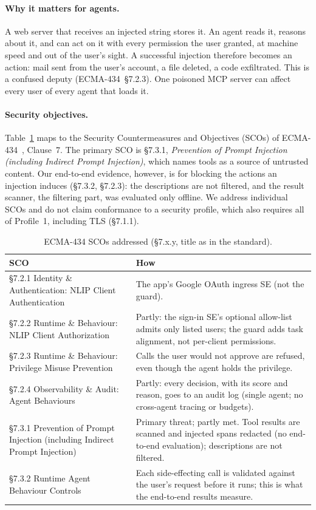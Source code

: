 \paragraph{Why it matters for agents.} A web server that receives an injected string stores
it. An agent reads it, reasons about it, and can act on it with every permission the user
granted, at machine speed and out of the user's sight. A successful injection therefore
becomes an action: mail sent from the user's account, a file deleted, a code exfiltrated.
This is a confused deputy (ECMA-434~\S7.2.3). One poisoned MCP server can affect every user
of every agent that loads it.

\paragraph{Security objectives.} Table~\ref{tab:sco} maps \sys to the Security
Countermeasures and Objectives (SCOs) of ECMA-434~\cite{ecma434}, Clause~7. The primary SCO
is \S7.3.1, \emph{Prevention of Prompt Injection (including Indirect Prompt Injection)},
which names tools as a source of untrusted content. Our end-to-end evidence, however, is for
blocking the actions an injection induces (\S7.3.2, \S7.2.3): the descriptions are not
filtered, and the result scanner, the filtering part, was evaluated only offline. We address individual SCOs and do not
claim conformance to a security profile, which also requires all of Profile~1, including TLS
(\S7.1.1).

\begin{table}[t]
\caption{ECMA-434 SCOs addressed (\S7.x.y, title as in the standard).}\label{tab:sco}
\small
\begin{tabular}{@{}>{\raggedright\arraybackslash}p{}>{\raggedright\arraybackslash}p{}@{}}
\toprule
SCO & How \\
\midrule
\S7.2.1 Identity \& Authentication: NLIP Client Authentication
  & The app's Google OAuth ingress SE (not the guard). \\
\S7.2.2 Runtime \& Behaviour: NLIP Client Authorization
  & Partly: the sign-in SE's optional allow-list admits only listed users; the guard adds task
    alignment, not per-client permissions. \\
\S7.2.3 Runtime \& Behaviour: Privilege Misuse Prevention
  & Calls the user would not approve are refused, even though the agent holds the privilege. \\
\S7.2.4 Observability \& Audit: Agent Behaviours
  & Partly: every decision, with its score and reason, goes to an audit log (single agent; no
    cross-agent tracing or budgets). \\
\S7.3.1 Prevention of Prompt Injection (including Indirect Prompt Injection)
  & Primary threat; partly met. Tool results are scanned and injected spans redacted (no
    end-to-end evaluation); descriptions are not filtered. \\
\S7.3.2 Runtime Agent Behaviour Controls
  & Each side-effecting call is validated against the user's request before it runs; this
    is what the end-to-end results measure. \\
\bottomrule
\end{tabular}
\end{table}
